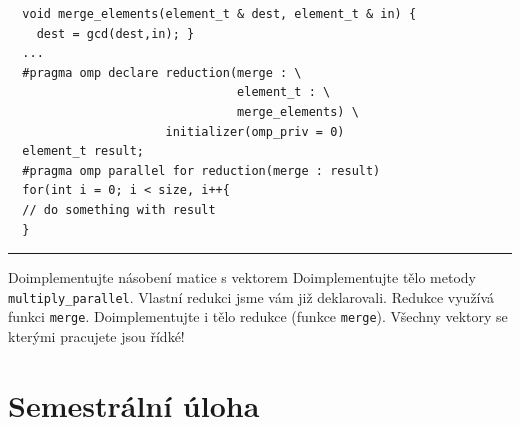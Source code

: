 \documentclass[usenames,dvipsnames,9pt]{beamer}
\begin{document}
{
\begin{frame}[fragile]

  \begin{verbatim}
  void merge_elements(element_t & dest, element_t & in) {
  	dest = gcd(dest,in); }
  ...
  #pragma omp declare reduction(merge : \
                                element_t : \
                                merge_elements) \
  	                  initializer(omp_priv = 0)
  element_t result;
  #pragma omp parallel for reduction(merge : result)
  for(int i = 0; i < size, i++{
  // do something with result
  }
 \end{verbatim}
 
  \vspace{1em}\pause\hrule\vspace{1em}

  \begin{block}{Doimplementujte násobení matice s vektorem}
    Doimplementujte tělo metody \texttt{multiply\_parallel}. Vlastní redukci jsme vám již deklarovali. Redukce využívá funkci \texttt{merge}. Doimplementujte i tělo redukce (funkce \texttt{merge}). Všechny vektory se kterými pracujete jsou řídké!
  \end{block}

\end{frame}
}

\section{Semestrální úloha}
\end{document}
